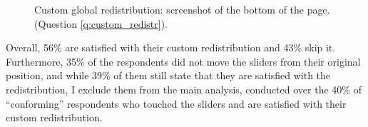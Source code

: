 \documentclass[12pt,english]{article}
\begin{document}
\begin{bibunit}
\begin{figure}[h!]
   \caption[Custom redistribution task screenshot]{Custom global redistribution: screenshot of the bottom of the page. (Question \ref{q:custom_redistr}).
    }\label{fig:custom_redistr_question}
\end{figure}

Overall, 56\% are satisfied with their custom redistribution and 43\% skip it. Furthermore, 35\% of the respondents did not move the sliders from their original position, and while 39\% of them still state that they are satisfied with the redistribution, I exclude them from the main analysis, conducted over the 40\% of ``conforming'' %
respondents who touched the sliders and are satisfied with their custom redistribution. 


\end{bibunit}
\end{document}
